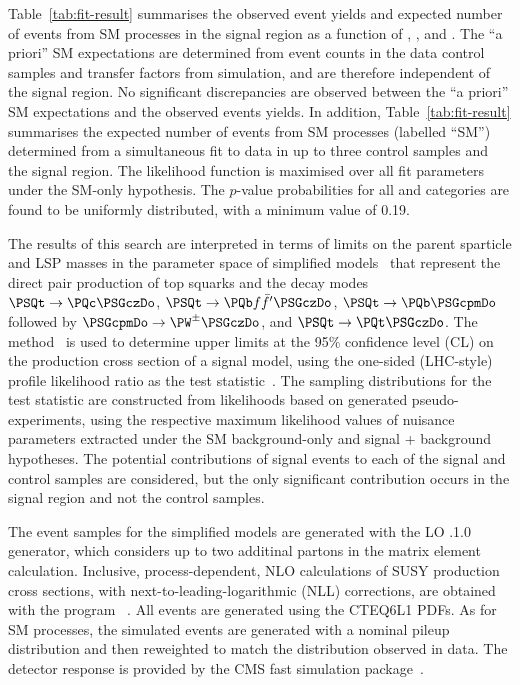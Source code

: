 Table~\ref{tab:fit-result} summarises the observed event yields and
expected number of events from SM processes in the signal region as a
function of \njet, \nb, and \scalht. The ``a priori'' SM expectations
are determined from event counts in the data control samples and
transfer factors from simulation, and are therefore independent of the
signal region. No significant discrepancies are observed between the
``a priori'' SM expectations and the observed events yields. In
addition, Table~\ref{tab:fit-result} summarises the expected number of
events from SM processes (labelled ``SM'') determined from a
simultaneous fit to data in up to three control samples and the signal
region. The likelihood function is maximised over all fit parameters
under the SM-only hypothesis. The $p$-value probabilities for all
\njet and \nb categories are found to be uniformly distributed, with a
minimum value of 0.19.

The results of this search are interpreted in terms of limits on the
parent sparticle and LSP masses in the parameter space of simplified
models~\cite{Alwall:2008ag, Alwall:2008va, sms} that represent the
direct pair production of top squarks and the decay modes $\PSQt
\to\PQc\PSGczDo$, $\PSQt \to{\PQb \ffbp} \PSGczDo$, $\PSQt \to \PQb
\PSGcpmDo$ followed by $\PSGcpmDo \to \PW^\pm \PSGczDo$, and $\PSQt
\to \PQt \PSGczDo$. The \cls method~\cite{read,junk} is used to
determine upper limits at the 95\% confidence level (CL) on the
production cross section of a signal model, using the one-sided
(LHC-style) profile likelihood ratio as the test
statistic~\cite{higgs-comb}. The sampling distributions for the test
statistic are constructed from likelihoods based on generated
pseudo-experiments, using the respective maximum likelihood values of
nuisance parameters extracted under the SM background-only and signal
+ background hypotheses. The potential contributions of signal events
to each of the signal and control samples are considered, but the only
significant contribution occurs in the signal region and not the
control samples.

The event samples for the simplified models are generated with the LO
.1.0 generator, which considers up to two additinal
partons in the matrix element calculation. Inclusive,
process-dependent, NLO calculations of SUSY production cross sections,
with next-to-leading-logarithmic (NLL) corrections, are obtained with
the program ~\cite{Beenakker:1996ch, PhysRevD.80.095004,
  PhysRevLett.102.111802, PhysRevD.80.095004, 1126-6708-2009-12-041,
  doi:10.1142/S0217751X11053560, susy-nlo-nll}. All events are
generated using the \textsc{CTEQ6L1} PDFs. As for SM processes, the
simulated events are generated with a nominal pileup distribution and
then reweighted to match the distribution observed in data. The
detector response is provided by the CMS fast simulation
package~\cite{fastsim}.

